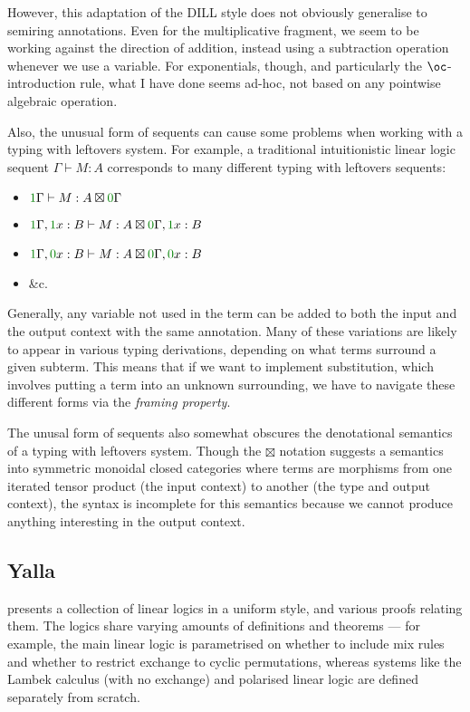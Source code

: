 However, this adaptation of the DILL style does not obviously generalise to
semiring annotations.
Even for the multiplicative fragment, we seem to be working against the
direction of addition, instead using a subtraction operation whenever we use a
variable.
For exponentials, though, and particularly the $\oc$-introduction rule, what I
have done seems ad-hoc, not based on any pointwise algebraic operation.

Also, the unusual form of sequents can cause some problems when working with a
typing with leftovers system.
For example, a traditional intuitionistic linear logic sequent
$\Gamma \vdash M : A$ corresponds to many different typing with leftovers
sequents:
\begin{itemize}
  \item $\gr1\Gamma \vdash M : A \boxtimes \gr0\Gamma$
  \item $\gr1\Gamma, \gr1x : B \vdash M : A \boxtimes \gr0\Gamma, \gr1x : B$
  \item $\gr1\Gamma, \gr0x : B \vdash M : A \boxtimes \gr0\Gamma, \gr0x : B$
  \item \&c.
\end{itemize}

Generally, any variable not used in the term can be added to both the input and
the output context with the same annotation.
Many of these variations are likely to appear in various typing derivations,
depending on what terms surround a given subterm.
This means that if we want to implement substitution, which involves putting a
term into an unknown surrounding, we have to navigate these different forms via
the \emph{framing property}.

The unusal form of sequents also somewhat obscures the denotational semantics of
a typing with leftovers system.
Though the $\boxtimes$ notation suggests a semantics into symmetric monoidal
closed categories where terms are morphisms from one iterated tensor product
(the input context) to another (the type and output context), the syntax is
incomplete for this semantics because we cannot produce anything interesting in
the output context.

\subsection{Yalla}

 presents a collection of linear logics in a uniform style, and
various proofs relating them.
The logics share varying amounts of definitions and theorems --- for example,
the main linear logic is parametrised on whether to include mix rules and
whether to restrict exchange to cyclic permutations, whereas systems like the
Lambek calculus (with no exchange) and polarised linear logic are defined
separately from scratch.

